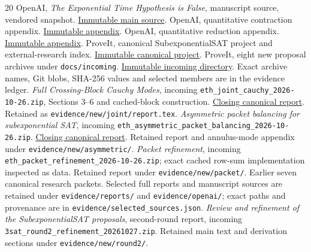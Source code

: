 \documentclass[11pt,letterpaper]{article}
\theoremstyle{remark}\newtheorem{remark}[theorem]{Remark}
\begin{document}
\begin{thebibliography}{20}\small
{} OpenAI, \emph{The Exponential Time Hypothesis is False}, manuscript source, vendored snapshot. \href{https://github.com/VladimirReshetnikov/ProveIt/blob/474ddba696a5d385c091c23fb2995f69edd13e00/lib/openai-math/preprints/The-Exponential-Time-Hypothesis-is-False-October-25-2026/build/main_full_version.tex}{Immutable main source}.
 OpenAI, quantitative contraction appendix. \href{https://github.com/VladimirReshetnikov/ProveIt/blob/474ddba696a5d385c091c23fb2995f69edd13e00/lib/openai-math/preprints/The-Exponential-Time-Hypothesis-is-False-October-25-2026/build/quantitative-contraction.tex}{Immutable appendix}.
 OpenAI, quantitative reduction appendix. \href{https://github.com/VladimirReshetnikov/ProveIt/blob/474ddba696a5d385c091c23fb2995f69edd13e00/lib/openai-math/preprints/The-Exponential-Time-Hypothesis-is-False-October-25-2026/build/quantitative-reduction.tex}{Immutable appendix}.
 ProveIt, canonical SubexponentialSAT project and external-research index. \href{https://github.com/VladimirReshetnikov/ProveIt/tree/474ddba696a5d385c091c23fb2995f69edd13e00/Computability/SubexponentialSAT}{Immutable canonical project}.
 ProveIt, eight new proposal archives under \texttt{docs/incoming}. \href{https://github.com/VladimirReshetnikov/ProveIt/tree/d098ba436b33df19365a44dd178694ff52845d19/docs/incoming}{Immutable incoming directory}. Exact archive names, Git blobs, SHA-256 values and selected members are in the evidence ledger.
 \emph{Full Crossing-Block Cauchy Modes}, incoming \texttt{eth\_joint\_cauchy\_2026-10-26.zip}, Sections 3--6 and cached-block construction. \href{https://github.com/VladimirReshetnikov/ProveIt/blob/474ddba696a5d385c091c23fb2995f69edd13e00/Computability/SubexponentialSAT/Research/eth_joint_cauchy/report.tex}{Closing canonical report}. Retained as \texttt{evidence/new/joint/report.tex}.
 \emph{Asymmetric packet balancing for subexponential SAT}, incoming \texttt{eth\_asymmetric\_packet\_balancing\_2026-10-26.zip}. \href{https://github.com/VladimirReshetnikov/ProveIt/blob/474ddba696a5d385c091c23fb2995f69edd13e00/Computability/SubexponentialSAT/Research/eth_asymmetric_packet_balancing/report.tex}{Closing canonical report}. Retained report and annulus-mode appendix under \texttt{evidence/new/asymmetric/}.
 \emph{Packet refinement}, incoming \texttt{eth\_packet\_refinement\_2026-10-26.zip}; exact cached row-sum implementation inspected as data. Retained report under \texttt{evidence/new/packet/}.
 Earlier seven canonical research packets. Selected full reports and manuscript sources are retained under \texttt{evidence/reports/} and \texttt{evidence/openai/}; exact paths and provenance are in \texttt{evidence/selected\_sources.json}.
 \emph{Review and refinement of the SubexponentialSAT proposals}, second-round report, incoming \texttt{3sat\_round2\_refinement\_20261027.zip}. Retained main text and derivation sections under \texttt{evidence/new/round2/}.
\end{thebibliography}
\end{document}

